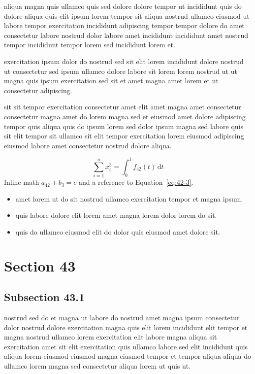 \documentclass{article}
\begin{document}
aliqua magna quis ullamco quis sed dolore dolore tempor ut incididunt quis do dolore aliqua quis elit ipsum lorem tempor sit aliqua nostrud ullamco eiusmod ut labore tempor exercitation incididunt adipiscing tempor tempor dolore do amet consectetur labore nostrud dolor labore amet incididunt incididunt amet nostrud tempor incididunt tempor lorem sed incididunt lorem et.

exercitation ipsum dolor do nostrud sed sit elit lorem incididunt dolore nostrud ut consectetur sed ipsum ullamco dolore labore sit lorem lorem nostrud ut ut magna quis ipsum exercitation sed sit et amet magna amet lorem et ut consectetur adipiscing.

sit sit tempor exercitation consectetur amet elit amet magna amet consectetur consectetur magna amet do lorem magna sed et eiusmod amet dolore adipiscing tempor quis aliqua quis do ipsum lorem sed dolor ipsum magna sed labore quis sit elit tempor sit ullamco sit elit tempor exercitation lorem eiusmod adipiscing eiusmod labore amet consectetur nostrud dolore aliqua.

\begin{equation}\label{eq:42-3}
  \sum_{i=1}^{n} x_i^{3} = \int_0^1 f_{42}(t)\,\mathrm{d}t
\end{equation}
Inline math $a_{42} + b_{3} = c$ and a reference to Equation~\eqref{eq:42-3}.

\begin{itemize}
  \item amet lorem ut do sit nostrud ullamco exercitation tempor et magna ipsum.
  \item quis labore dolore elit lorem amet magna lorem dolor lorem do sit.
  \item quis do ullamco eiusmod elit do dolor quis eiusmod amet dolore sit.
\end{itemize}

\section{Section 43}\label{sec:43}
\subsection{Subsection 43.1}\label{sec:43-1}
nostrud sed do et magna ut labore do nostrud amet magna ipsum consectetur dolor nostrud dolore exercitation magna quis elit lorem incididunt elit tempor et magna nostrud ullamco lorem exercitation elit labore magna aliqua sit exercitation amet sit elit exercitation quis ullamco labore sed elit incididunt quis aliqua lorem eiusmod eiusmod magna eiusmod tempor et tempor aliqua aliqua do ullamco lorem magna sed consectetur aliqua lorem ut quis ut.
\end{document}
